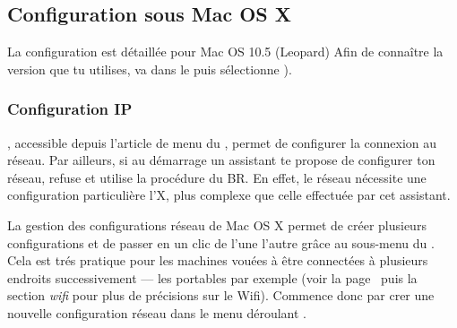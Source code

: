 

\subsection{Configuration sous Mac OS X}

La configuration est détaillée pour Mac OS 10.5 (Leopard) %
Afin de connaître la version que tu utilises, va dans le  puis sélectionne ).

\subsubsection{Configuration IP}

 , accessible depuis l'article de menu  du , permet de configurer la connexion au réseau. Par ailleurs, si au démarrage un assistant te propose de configurer ton réseau, refuse et utilise la procédure du BR. En effet, le réseau nécessite une configuration particulière  l'X, plus complexe que celle effectuée par cet assistant.



La gestion des configurations réseau de Mac OS X permet de créer plusieurs configurations et de passer en un clic de l'une  l'autre grâce au sous-menu  du . Cela est trés pratique pour les machines vouées à être connectées à plusieurs endroits successivement --- les portables par exemple (voir la page~\pageref{wifi} puis la section \emph{wifi} pour plus de précisions sur le Wifi). Commence donc par crer une nouvelle configuration réseau dans le menu déroulant .


